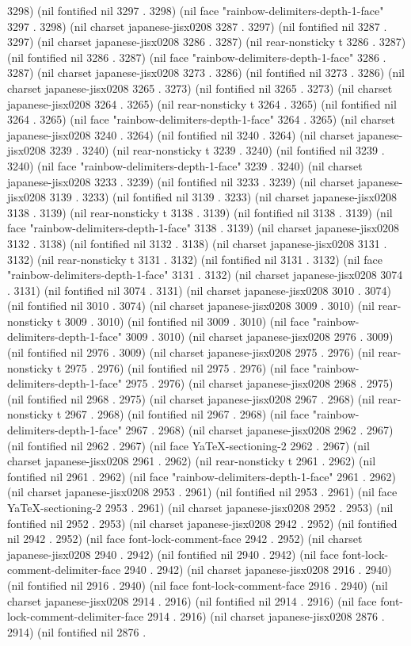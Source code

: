 3298) (nil fontified nil 3297 . 3298) (nil face "rainbow-delimiters-depth-1-face" 3297 . 3298) (nil charset japanese-jisx0208 3287 . 3297) (nil fontified nil 3287 . 3297) (nil charset japanese-jisx0208 3286 . 3287) (nil rear-nonsticky t 3286 . 3287) (nil fontified nil 3286 . 3287) (nil face "rainbow-delimiters-depth-1-face" 3286 . 3287) (nil charset japanese-jisx0208 3273 . 3286) (nil fontified nil 3273 . 3286) (nil charset japanese-jisx0208 3265 . 3273) (nil fontified nil 3265 . 3273) (nil charset japanese-jisx0208 3264 . 3265) (nil rear-nonsticky t 3264 . 3265) (nil fontified nil 3264 . 3265) (nil face "rainbow-delimiters-depth-1-face" 3264 . 3265) (nil charset japanese-jisx0208 3240 . 3264) (nil fontified nil 3240 . 3264) (nil charset japanese-jisx0208 3239 . 3240) (nil rear-nonsticky t 3239 . 3240) (nil fontified nil 3239 . 3240) (nil face "rainbow-delimiters-depth-1-face" 3239 . 3240) (nil charset japanese-jisx0208 3233 . 3239) (nil fontified nil 3233 . 3239) (nil charset japanese-jisx0208 3139 . 3233) (nil fontified nil 3139 . 3233) (nil charset japanese-jisx0208 3138 . 3139) (nil rear-nonsticky t 3138 . 3139) (nil fontified nil 3138 . 3139) (nil face "rainbow-delimiters-depth-1-face" 3138 . 3139) (nil charset japanese-jisx0208 3132 . 3138) (nil fontified nil 3132 . 3138) (nil charset japanese-jisx0208 3131 . 3132) (nil rear-nonsticky t 3131 . 3132) (nil fontified nil 3131 . 3132) (nil face "rainbow-delimiters-depth-1-face" 3131 . 3132) (nil charset japanese-jisx0208 3074 . 3131) (nil fontified nil 3074 . 3131) (nil charset japanese-jisx0208 3010 . 3074) (nil fontified nil 3010 . 3074) (nil charset japanese-jisx0208 3009 . 3010) (nil rear-nonsticky t 3009 . 3010) (nil fontified nil 3009 . 3010) (nil face "rainbow-delimiters-depth-1-face" 3009 . 3010) (nil charset japanese-jisx0208 2976 . 3009) (nil fontified nil 2976 . 3009) (nil charset japanese-jisx0208 2975 . 2976) (nil rear-nonsticky t 2975 . 2976) (nil fontified nil 2975 . 2976) (nil face "rainbow-delimiters-depth-1-face" 2975 . 2976) (nil charset japanese-jisx0208 2968 . 2975) (nil fontified nil 2968 . 2975) (nil charset japanese-jisx0208 2967 . 2968) (nil rear-nonsticky t 2967 . 2968) (nil fontified nil 2967 . 2968) (nil face "rainbow-delimiters-depth-1-face" 2967 . 2968) (nil charset japanese-jisx0208 2962 . 2967) (nil fontified nil 2962 . 2967) (nil face YaTeX-sectioning-2 2962 . 2967) (nil charset japanese-jisx0208 2961 . 2962) (nil rear-nonsticky t 2961 . 2962) (nil fontified nil 2961 . 2962) (nil face "rainbow-delimiters-depth-1-face" 2961 . 2962) (nil charset japanese-jisx0208 2953 . 2961) (nil fontified nil 2953 . 2961) (nil face YaTeX-sectioning-2 2953 . 2961) (nil charset japanese-jisx0208 2952 . 2953) (nil fontified nil 2952 . 2953) (nil charset japanese-jisx0208 2942 . 2952) (nil fontified nil 2942 . 2952) (nil face font-lock-comment-face 2942 . 2952) (nil charset japanese-jisx0208 2940 . 2942) (nil fontified nil 2940 . 2942) (nil face font-lock-comment-delimiter-face 2940 . 2942) (nil charset japanese-jisx0208 2916 . 2940) (nil fontified nil 2916 . 2940) (nil face font-lock-comment-face 2916 . 2940) (nil charset japanese-jisx0208 2914 . 2916) (nil fontified nil 2914 . 2916) (nil face font-lock-comment-delimiter-face 2914 . 2916) (nil charset japanese-jisx0208 2876 . 2914) (nil fontified nil 2876 . 